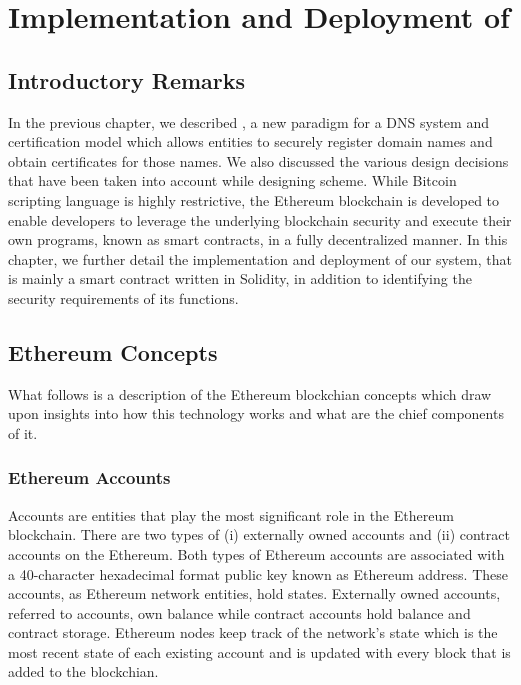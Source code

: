 
\chapter{Implementation and Deployment of \Ghazalstar}
\label{chap:Implementation and Deployment}
\section{Introductory Remarks}

In the previous chapter, we described \Ghazalstar, a new paradigm for a DNS system and certification model which allows entities to securely register domain names and obtain certificates for those names. We also discussed the various design decisions that have been taken into account while designing \Ghazalstar scheme. While Bitcoin scripting language is highly restrictive, the Ethereum blockchain is developed to enable developers to leverage the underlying blockchain security and execute their own programs, known as smart contracts, in a fully decentralized manner. In this chapter, we further detail the implementation and deployment of our system, that is mainly a smart contract written in Solidity, in addition to identifying the security requirements of its functions.

\section{Ethereum Concepts}

What follows is a description of the Ethereum blockchian concepts which draw upon insights into how this technology works and what are the chief components of it.

\subsection{Ethereum Accounts}

Accounts are entities that play the most significant role in the Ethereum blockchain. There are two types of (i) externally owned accounts and (ii) contract accounts on the Ethereum. Both types of Ethereum accounts are associated with a 40-character hexadecimal format public key known as Ethereum address. These accounts, as Ethereum network entities, hold states. Externally owned accounts, referred to accounts, own balance while contract accounts hold balance and contract storage. 
Ethereum nodes keep track of the network's state which is the most recent state of each existing account and is updated with every block that is added to the blockchian. 
